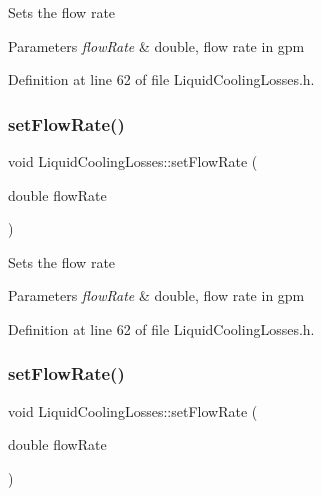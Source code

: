 Sets the flow rate 
\begin{DoxyParams}{Parameters}
{\em flow\+Rate} & double, flow rate in gpm \\
\hline
\end{DoxyParams}


Definition at line 62 of file Liquid\+Cooling\+Losses.\+h.

\mbox{\label{class_liquid_cooling_losses_a7739742c5f21919a62c304b7c525b1b6}} 
\subsubsection{\texorpdfstring{set\+Flow\+Rate()}{setFlowRate()}\hspace{0.1cm}{\footnotesize\ttfamily [2/3]}}
{\footnotesize\ttfamily void Liquid\+Cooling\+Losses\+::set\+Flow\+Rate (\begin{DoxyParamCaption}\item[{double}]{flow\+Rate }\end{DoxyParamCaption})\hspace{0.3cm}{\ttfamily [inline]}}

Sets the flow rate 
\begin{DoxyParams}{Parameters}
{\em flow\+Rate} & double, flow rate in gpm \\
\hline
\end{DoxyParams}


Definition at line 62 of file Liquid\+Cooling\+Losses.\+h.

\mbox{\label{class_liquid_cooling_losses_a7739742c5f21919a62c304b7c525b1b6}} 
\subsubsection{\texorpdfstring{set\+Flow\+Rate()}{setFlowRate()}\hspace{0.1cm}{\footnotesize\ttfamily [3/3]}}
{\footnotesize\ttfamily void Liquid\+Cooling\+Losses\+::set\+Flow\+Rate (\begin{DoxyParamCaption}\item[{double}]{flow\+Rate }\end{DoxyParamCaption})\hspace{0.3cm}{\ttfamily [inline]}}

